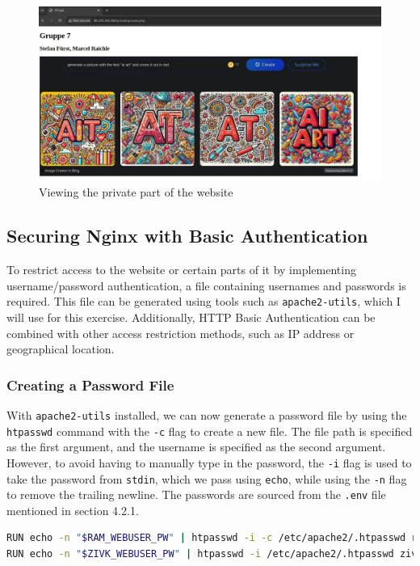 \documentclass[a4paper]{article}
\newcommand{\abc}{\hfill \break}
\begin{document}
\begin{figure}[!htbp]
	\includegraphics[scale=0.2]{images/privatphp.png}
	\centering
	\caption{Viewing the private part of the website}
\end{figure}\abc\newpage
\subsection{Securing Nginx with Basic Authentication}
To restrict access to the website or certain parts of it by implementing username/password authentication, a file containing usernames and passwords is required. This file can be generated using tools such as \texttt{apache2-utils}, which I will use for this exercise. Additionally, HTTP Basic Authentication can be combined with other access restriction methods, such as IP address or geographical location. \cite{nginx-basic-auth}
\subsubsection{Creating a Password File}
With \texttt{apache2-utils} installed, we can now generate a password file by using the \texttt{htpasswd} command with the \texttt{-c} flag to create a new file. The file path is specified as the first argument, and the username is specified as the second argument. However, to avoid having to manually type in the password, the \texttt{-i} flag is used to take the password from \texttt{stdin}, which we pass using \texttt{echo}, while using the \texttt{-n} flag to remove the trailing newline. The passwords are sourced from the \texttt{.env} file mentioned in section 4.2.1. \cite{nginx-basic-auth, htpasswd, echo-mangapge}
\begin{lstlisting}[language=bash]
RUN echo -n "$RAM_WEBUSER_PW" | htpasswd -i -c /etc/apache2/.htpasswd ram-webuser
RUN echo -n "$ZIVK_WEBUSER_PW" | htpasswd -i /etc/apache2/.htpasswd zivk-webuser
\end{lstlisting}
\end{document}
